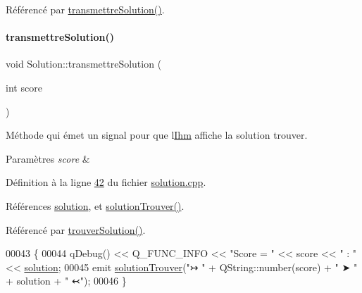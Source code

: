 Référencé par \hyperlink{solution_8cpp_source_l00042}{transmettre\+Solution()}.

\mbox{\label{class_solution_a334ffddf70bd379a0af7c7e93750d6b5}} 
\paragraph{\texorpdfstring{transmettre\+Solution()}{transmettreSolution()}}
{\footnotesize\ttfamily void Solution\+::transmettre\+Solution (\begin{DoxyParamCaption}\item[{int}]{score }\end{DoxyParamCaption})\hspace{0.3cm}{\ttfamily [private]}}



Méthode qui émet un signal pour que l\textquotesingle{}\hyperlink{class_ihm}{Ihm} affiche la solution trouver. 


\begin{DoxyParams}{Paramètres}
{\em score} & \\
\hline
\end{DoxyParams}


Définition à la ligne \hyperlink{solution_8cpp_source_l00042}{42} du fichier \hyperlink{solution_8cpp_source}{solution.\+cpp}.



Références \hyperlink{solution_8h_source_l00039}{solution}, et \hyperlink{class_solution_a052b7ba921e7b211d14f2bbbc6b63832}{solution\+Trouver()}.



Référencé par \hyperlink{solution_8cpp_source_l00296}{trouver\+Solution()}.


\begin{DoxyCode}
00043 \{
00044     qDebug() << Q\_FUNC\_INFO << \textcolor{stringliteral}{"Score = "} << score << \textcolor{stringliteral}{" : "} << \hyperlink{class_solution_a03b47dedfe8a8f8244f7e633cbaa30fb}{solution};
00045     emit \hyperlink{class_solution_a052b7ba921e7b211d14f2bbbc6b63832}{solutionTrouver}(\textcolor{stringliteral}{"↣  "} + QString::number(score) + \textcolor{stringliteral}{" ➤ "} + solution + \textcolor{stringliteral}{"  ↢"});
00046 \}
\end{DoxyCode}
\mbox{\label{class_solution_a9ab0b0fd2b557f5abda8bd1a6da641e4}} 
